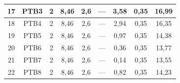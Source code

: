 \documentclass[	DIV=calc,%
							paper=a4,%
							fontsize=12pt,%
							onecolumn]{scrartcl}	 					%
\begin{document}
\begin{tabular}{|c|c|c|c|c|c|c|c|c|}
	17                 & PTB3               & 2                                                    & 8,46                                        & 2,6                                           & ---                                           & 3,58                                             & 0,35                                            & 16,99                                                             \\ \hline
	18                 & PTB4               & 2                                                    & 8,46                                        & 2,6                                           & ---                                           & 2,94                                             & 0,35                                            & 16,35                                                             \\ \hline
	19                 & PTB5               & 2                                                    & 8,46                                        & 2,6                                           & ---                                           & 0,97                                             & 0,35                                            & 14,38                                                             \\ \hline
	20                 & PTB6               & 2                                                    & 8,46                                        & 2,6                                           & ---                                           & 0,36                                             & 0,35                                            & 13,77                                                             \\ \hline
	21                 & PTB7               & 2                                                    & 8,46                                        & 2,6                                           & ---                                           & 0,14                                             & 0,35                                            & 13,55                                                             \\ \hline
	22                 & PTB8               & 2                                                    & 8,46                                        & 2,6                                           & ---                                           & 0,82                                             & 0,35                                            & 14,23                                                             \\ \hline

\end{tabular}
\end{document}
